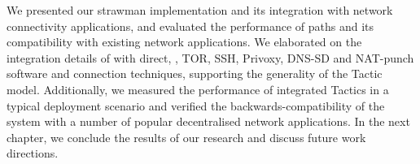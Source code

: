 We presented our strawman \signpost implementation and its  integration with
network connectivity applications, and evaluated the performance of \signpost
paths and its compatibility with existing network applications. We elaborated on
the integration details of \signpost  with direct, \openvpn, TOR, SSH, Privoxy,
DNS-SD and NAT-punch software and connection techniques, supporting  the
generality of the \signpost Tactic model. Additionally, we measured the
performance of integrated Tactics in a typical deployment scenario and verified
the backwards-compatibility of the system with a number of popular decentralised
network applications. In the next chapter, we conclude the results of our research and
discuss future work directions.



